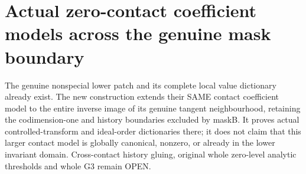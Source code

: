 \section{Actual zero-contact coefficient models across the genuine mask boundary}

The genuine nonspecial lower patch and its complete local value dictionary
already exist. The new construction extends their SAME contact coefficient
model to the entire inverse image of its genuine tangent neighbourhood,
retaining the codimension-one and history boundaries excluded by maskB.
It proves actual controlled-transform and ideal-order dictionaries there;
it does not claim that this larger contact model is globally canonical,
nonzero, or already in the lower invariant domain. Cross-contact history
gluing, original whole zero-level analytic thresholds and whole G3 remain OPEN.

